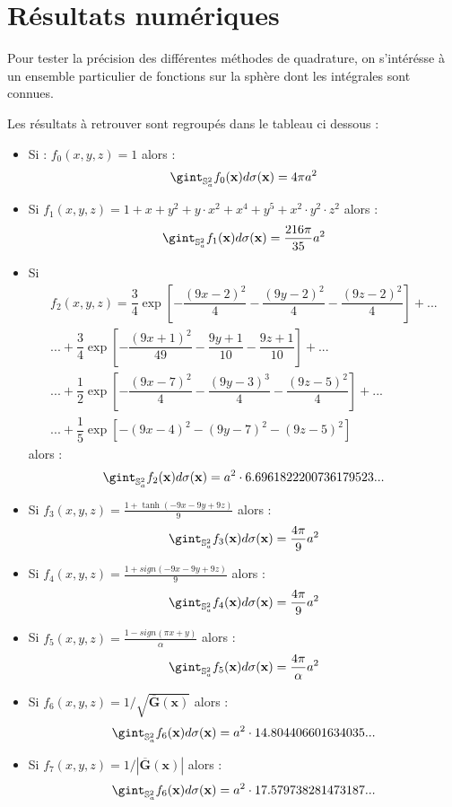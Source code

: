 \section{Résultats numériques} %

Pour tester la précision des différentes méthodes de quadrature, on s'intérésse à un ensemble particulier de fonctions sur la sphère dont les intégrales sont connues.

Les résultats à retrouver sont regroupés dans le tableau ci dessous :


\begin{itemize}
\item Si : $f_0(x,y,z)=1$ alors :
$$
\gint_{\mathbb{S}_a^2} f_0(\mathbf{x}) d\sigma (\mathbf{x})=4 \pi a^2
$$
\item Si $f_1(x,y,z)=1+x+y^2+y\cdot x^2+x^4+y^5+x^2 \cdot y^2 \cdot z^2$ alors :
$$
\gint_{\mathbb{S}_a^2} f_1(\mathbf{x}) d\sigma (\mathbf{x})=\dfrac{216 \pi}{35} a^2
$$
\item Si 
\begin{multline}
f_2(x,y,z) = \dfrac{3}{4} \exp \left[ - \dfrac{(9x-2)^2}{4} - \dfrac{(9y-2)^2}{4} - \dfrac{(9z-2)^2}{4} \right] + ...\\
... + \dfrac{3}{4} \exp \left[ - \dfrac{(9x+1)^2}{49} - \dfrac{9y+1}{10} - \dfrac{9z+1}{10} \right] + ...\\
... + \dfrac{1}{2} \exp \left[ - \dfrac{(9x-7)^2}{4} - \dfrac{(9y-3)^3}{4} - \dfrac{(9z-5)^2}{4} \right] + ...\\
... + \dfrac{1}{5} \exp \left[ - (9x-4)^2 - (9y-7)^2 - (9z-5)^2 \right]
\end{multline}
alors :
$$
\gint_{\mathbb{S}_a^2} f_2(\mathbf{x}) d\sigma (\mathbf{x})=a^2 \cdot 6.6961822200736179523...
$$
\item Si $f_3(x,y,z)=\frac{1+\tanh(-9x-9y+9z)}{9}$ alors :
$$
\gint_{\mathbb{S}_a^2} f_3(\mathbf{x}) d\sigma (\mathbf{x})=\frac{4\pi}{9} a^2
$$
\item Si $f_4(x,y,z)=\frac{1+sign(-9x-9y+9z)}{9}$ alors :
$$
\gint_{\mathbb{S}_a^2} f_4(\mathbf{x}) d\sigma (\mathbf{x})=\frac{4\pi}{9} a^2
$$
\item Si $f_5(x,y,z)=\frac{1-sign(\pi x + y)}{\alpha}$ alors :
$$
\gint_{\mathbb{S}_a^2} f_5(\mathbf{x}) d\sigma (\mathbf{x})=\frac{4\pi}{\alpha} a^2
$$
\item Si $f_6(x,y,z)=1/\sqrt{\overline{\mathbf{G}}(\mathbf{x})}$ alors :
$$
\gint_{\mathbb{S}_a^2} f_6(\mathbf{x}) d\sigma (\mathbf{x})=a^2 \cdot 14.804406601634035...
$$
\item Si $f_7(x,y,z)=1/|\overline{\mathbf{G}}(\mathbf{x})|$ alors :
$$
\gint_{\mathbb{S}_a^2} f_6(\mathbf{x}) d\sigma (\mathbf{x})=a^2 \cdot 17.579738281473187...
$$
\end{itemize}


